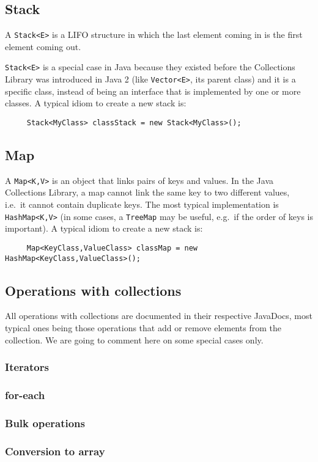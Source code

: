 \subsection{Stack}
\label{sec:stack}

A \verb+Stack<E>+ is a LIFO structure in which the last element coming in
is the first element coming out. 

\verb+Stack<E>+ is a special case in Java because they existed before the
Collections Library was introduced in Java 2 (like \verb+Vector<E>+, its
parent class) and it is a specific class, instead of being an
interface that is implemented by one or more classes. A typical idiom to
create a new stack is:

\begin{verbatim}
     Stack<MyClass> classStack = new Stack<MyClass>();
\end{verbatim}

\subsection{Map}
\label{sec:maps}

A \verb+Map<K,V>+ is an object that links pairs of keys and values. In
the Java Collections Library, a map cannot link the same key to two
different values, i.e.~it cannot contain duplicate keys. The most
typical implementation is \verb+HashMap<K,V>+ (in some cases, a
\verb+TreeMap+ may be useful, e.g.~if the order of keys is
important). A typical idiom to
create a new stack is:

\begin{verbatim}
     Map<KeyClass,ValueClass> classMap = new HashMap<KeyClass,ValueClass>();
\end{verbatim}



\subsection{Operations with collections}
\label{sec:oper-with-coll}

All operations with collections are documented in their respective
JavaDocs, most typical ones being those operations that add or remove
elements from the collection. We are going to comment here on some
special cases only. 

\subsubsection{Iterators}
\label{sec:iterators}



\subsubsection{for-each}
\label{sec:each}

\subsubsection{Bulk operations}
\label{sec:bulk-operations}

\subsubsection{Conversion to array}
\label{sec:conversion-array}


